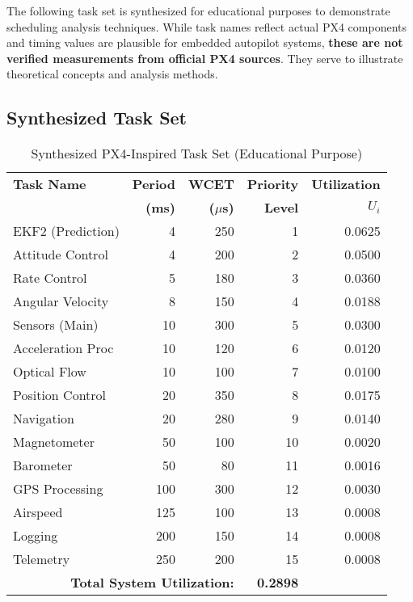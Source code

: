 \documentclass[12pt,a4paper]{article}
\begin{document}
The following task set is synthesized for educational purposes to demonstrate scheduling analysis techniques. While task names reflect actual PX4 components and timing values are plausible for embedded autopilot systems, \textbf{these are not verified measurements from official PX4 sources}. They serve to illustrate theoretical concepts and analysis methods.

\subsection{Synthesized Task Set}

\begin{table}[H]
\centering
\small
\begin{tabular}{|l|r|r|r|r|}
\hline
\textbf{Task Name} & \textbf{Period} & \textbf{WCET} & \textbf{Priority} & \textbf{Utilization} \\
\textbf{} & \textbf{(ms)} & \textbf{($\mu$s)} & \textbf{Level} & \textbf{$U_i$} \\
\hline
EKF2 (Prediction) & 4 & 250 & 1 & 0.0625 \\
Attitude Control & 4 & 200 & 2 & 0.0500 \\
Rate Control & 5 & 180 & 3 & 0.0360 \\
Angular Velocity & 8 & 150 & 4 & 0.0188 \\
Sensors (Main) & 10 & 300 & 5 & 0.0300 \\
Acceleration Proc & 10 & 120 & 6 & 0.0120 \\
Optical Flow & 10 & 100 & 7 & 0.0100 \\
Position Control & 20 & 350 & 8 & 0.0175 \\
Navigation & 20 & 280 & 9 & 0.0140 \\
Magnetometer & 50 & 100 & 10 & 0.0020 \\
Barometer & 50 & 80 & 11 & 0.0016 \\
GPS Processing & 100 & 300 & 12 & 0.0030 \\
Airspeed & 125 & 100 & 13 & 0.0008 \\
Logging & 200 & 150 & 14 & 0.0008 \\
Telemetry & 250 & 200 & 15 & 0.0008 \\
\hline
\multicolumn{3}{|r|}{\textbf{Total System Utilization:}} & \textbf{0.2898} \\
\hline
\end{tabular}
\caption{Synthesized PX4-Inspired Task Set (Educational Purpose)}
\label{tab:synthesized_tasks}
\end{table}
\end{document}
